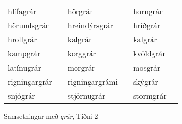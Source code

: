 \documentclass[../samsetningasafn.tex]{subfiles}
\begin{document}
\begin{wordlist}[H]
\begin{tcolorbox}
\begin{tabular}{BlBlBl}
		hlífagrár		&		& 	
		hörgrár		&		& 		
		horngrár		&		\\ 		
		hörundsgrár	&		& 		
		hreindýrsgrár	&	& 	
		hríðgrár		&		\\ 		
		hrollgrár		&		& 		
		kalgrár		&		& 		
		kalgrár		&		\\ 		
		kampgrár	&		& 	
		korggrár		&		& 		
		kvöldgrár	&		\\ 		
		latínugrár	&		& 	
		morgrár		&		& 		
		mosgrár		&		\\ 		
		rigningargrár &		& 	
		rigningargrámi & 	& 	
		skýgrár		&		\\ 	
		snjógrár		&		& 		
		stjörnugrár	&		& 	
		stormgrár	&				
	\end{tabular}

\end{tcolorbox}
	\caption{Samsetningar með \textit{grár}, Tíðni 2}
	\label{listi:gratt.2}
\end{wordlist}
\end{document}
